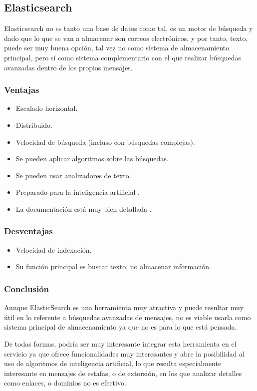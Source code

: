 \subsection{Elasticsearch}
Elasticsearch\cite{Elasticsearch} no es tanto una base de datos como tal, es un motor de búsqueda y dado que lo que se van a almacenar son correos electrónicos, y por tanto, texto, puede ser muy buena opción, tal vez no como sistema de almacenamiento principal, pero sí como sistema complementario con el que realizar búsquedas avanzadas dentro de los propios mensajes. 

\subsubsection{Ventajas}
\begin{itemize}
    \item Escalado horizontal.
    \item Distribuido.
    \item Velocidad de búsqueda (incluso con búsquedas complejas).
    \item Se pueden aplicar algoritmos sobre las búsquedas.
    \item Se pueden usar analizadores de texto.
    \item Preparado para la inteligencia artificial \cite{Elasticsearch_IA}.
    \item La documentación está muy bien detallada \cite{Elasticsearch_docu}.
\end{itemize}
\subsubsection{Desventajas}
\begin{itemize}
    \item Velocidad de indexación.
    \item Su función principal es buscar texto, no almacenar información.
\end{itemize}
\subsubsection{Conclusión}
Aunque ElasticSearch es una herramienta muy atractiva y puede resultar muy útil en lo referente a búsquedas avanzadas de mensajes, no es viable usarla como sistema principal de almacenamiento ya que no es para lo que está pensada. 

De todas formas, podría ser muy interesante integrar esta herramienta en el servicio ya que ofrece funcionalidades muy interesantes y abre la posibilidad al uso de algoritmos de inteligencia artificial, lo que resulta especialmente interesante en mensajes de estafas, o de extorsión, en los que analizar detalles como enlaces, o dominios no es efectivo. 
